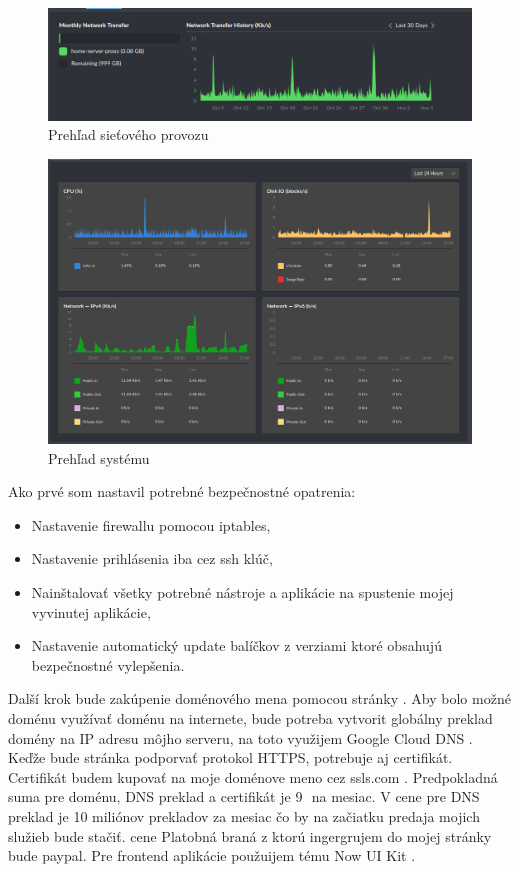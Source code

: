 \begin{figure}[ht!]
  \includegraphics[width=\linewidth]{images/3.png}
  \caption{Prehľad sieťového provozu}
  \label{img:three}
\end{figure}

\begin{figure}[ht!]
  \includegraphics[width=\linewidth]{images/4.png}
  \caption{Prehľad systému}
  \label{img:four}
\end{figure}

\noindent Ako prvé som nastavil potrebné bezpečnostné opatrenia:
\begin{itemize}
  \item Nastavenie firewallu pomocou iptables,
  \item Nastavenie prihlásenia iba cez ssh klúč,
  \item Nainštalovať všetky potrebné nástroje a aplikácie na spustenie mojej vyvinutej aplikácie,
  \item Nastavenie automatický update balíčkov z verziami ktoré obsahujú bezpečnostné vylepšenia.
\end{itemize}

Další krok bude zakúpenie doménového mena pomocou stránky \cite{domain}. Aby bolo možné doménu využívať doménu na internete, bude potreba vytvorit globálny preklad domény na IP adresu môjho serveru, na toto využijem Google Cloud DNS \cite{dns}. Keďže bude stránka podporvať protokol HTTPS, potrebuje aj certifikát. Certifikát budem kupovať na moje doménove meno cez ssls.com \cite{cert}. Predpokladná suma pre doménu, DNS preklad a certifikát je 9\,\texteuro~na mesiac. V cene pre DNS preklad je 10 miliónov prekladov za mesiac čo by na začiatku predaja mojich služieb bude stačiť. cene Platobná braná z ktorú ingergrujem do mojej stránky bude paypal. Pre frontend aplikácie použuijem tému Now UI Kit \cite{vue_kit}.
